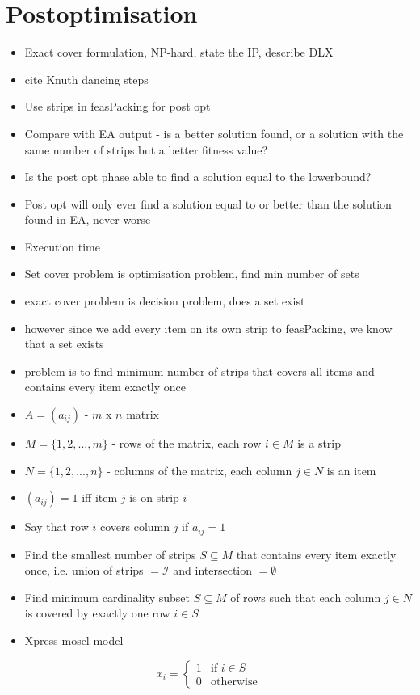 \documentclass{elsarticle}
\begin{document}
\section{Postoptimisation}
\begin{itemize}
	\item Exact cover formulation, NP-hard, state the IP, describe DLX
	\item cite Knuth dancing steps
	\item Use strips in feasPacking for post opt
	\item Compare with EA output - is a better solution found, or a solution with the same number of strips but a better fitness value?
	\item Is the post opt phase able to find a solution equal to the lowerbound?
	\item Post opt will only ever find a solution equal to or better than the solution found in EA, never worse
	\item Execution time
	\item Set cover problem is optimisation problem, find min number of sets
	\item exact cover problem is decision problem, does a set exist
	\item however since we add every item on its own strip to feasPacking, we know that a set exists
	\item problem is to find minimum number of strips that covers all items and contains every item exactly once
	\item $A = (a_{ij})$ - $m$ x $n$ matrix
	\item $M = \{1, 2,..., m\}$ - rows of the matrix, each row $i \in M$ is a strip
	\item $N = \{1, 2,...,n\}$ - columns of the matrix, each column $j \in N$ is an item
	\item $(a_{ij}) = 1$ iff item $j$ is on strip $i$
	\item Say that row $i$ covers column $j$ if $a_{ij} = 1$
	\item Find the smallest number of strips $S \subseteq M$ that contains every item exactly once, i.e. union of strips $= \mathcal{I}$ and intersection $= \emptyset$
	\item Find minimum cardinality subset $S \subseteq M$ of rows such that each column $j \in N$ is covered by exactly one row $i \in S$
	\item Xpress mosel model
\end{itemize}
\[x_i =
\begin{cases} 
1 & \text{if } i \in S \\
0 & \text{otherwise} 
\end{cases}
\]
\end{document}
